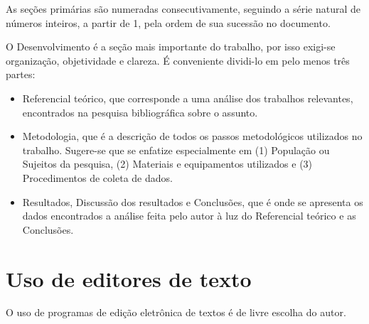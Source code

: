 As seções primárias são numeradas consecutivamente, seguindo a série
natural de números inteiros, a partir de 1, pela ordem de sua sucessão no
documento.

O Desenvolvimento é a seção mais importante do trabalho, por isso exigi-se
organização, objetividade e clareza. É conveniente dividi-lo em pelo menos
três partes:

\begin{itemize}

	\item Referencial teórico, que corresponde a uma análise dos trabalhos
	relevantes, encontrados na pesquisa bibliográfica sobre o assunto.
	\item Metodologia, que é a descrição de todos os passos metodológicos
	utilizados no trabalho. Sugere-se que se enfatize especialmente em (1)
	População ou Sujeitos da pesquisa, (2) Materiais e equipamentos
	utilizados e (3) Procedimentos de coleta de dados.
	\item Resultados, Discussão dos resultados e Conclusões, que é onde se
	apresenta os dados encontrados a análise feita pelo autor à luz do
	Referencial teórico e as Conclusões.

\end{itemize}

\section{Uso de editores de texto}

O uso de programas de edição eletrônica de textos é de livre escolha do autor.
